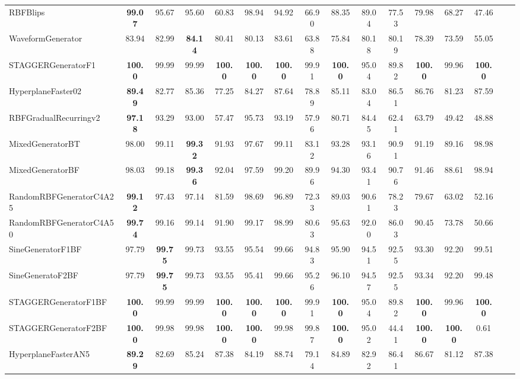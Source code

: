 \documentclass[reqno]{vcuthesis}
\numberwithin{equation}{chapter}
\begin{document}
\begin{table}[t!]
{\begin{tabularx}{1.45\textwidth}{l@{\extracolsep{\fill}}ccccccccccccccc}
RBFBlips &  \textbf{99.07} & 95.67 & 95.60 & 60.83 & 98.94 & 94.92 & 66.90 & 88.35 & 89.04 & 77.53 & 79.98 & 68.27 & 47.46 \\
WaveformGenerator & 83.94 & 82.99 &  \textbf{84.14} & 80.41 & 80.13 & 83.61 & 63.88 & 75.84 & 80.18 & 80.19 & 78.39 & 73.59 & 55.05 \\
STAGGERGeneratorF1 &  \textbf{100.0} & 99.99 & 99.99 &  \textbf{100.0} &  \textbf{100.0} &  \textbf{100.0} & 99.91 &  \textbf{100.0} & 95.04 & 89.82 &  \textbf{100.0} & 99.96 &  \textbf{100.0}  \\
HyperplaneFaster02 &  \textbf{89.49} & 82.77 & 85.36 & 77.25 & 84.27 & 87.64 & 78.89 & 85.11 & 83.04 & 86.51 & 86.76 & 81.23 & 87.59 \\
RBFGradualRecurringv2 &  \textbf{97.18} & 93.29 & 93.00 & 57.47 & 95.73 & 93.19 & 57.96 & 80.71 & 84.45 & 62.41 & 63.79 & 49.42 & 48.88 \\
MixedGeneratorBT & 98.00 & 99.11 &  \textbf{99.32} & 91.93 & 97.67 & 99.11 & 83.12 & 93.28 & 93.16 & 90.91 & 91.19 & 89.16 & 98.98 \\
MixedGeneratorBF & 98.03 & 99.18 &  \textbf{99.36} & 92.04 & 97.59 & 99.20 & 89.96 & 94.30 & 93.41 & 90.76 & 91.46 & 88.61 & 98.94 \\
RandomRBFGeneratorC4A25 &  \textbf{99.12} & 97.43 & 97.14 & 81.59 & 98.69 & 96.89 & 72.33 & 89.03 & 90.61 & 78.23 & 79.67 & 63.02 & 52.16 \\
RandomRBFGeneratorC4A50 &  \textbf{99.74} & 99.16 & 99.14 & 91.90 & 99.17 & 98.99 & 80.63 & 95.63 & 92.00 & 86.03 & 90.45 & 73.78 & 50.66 \\
SineGeneratorF1BF & 97.79 &  \textbf{99.75} & 99.73 & 93.55 & 95.54 & 99.66 & 94.83 & 95.90 & 94.51 & 92.55 & 93.30 & 92.20 & 99.51 \\
SineGeneratoF2BF & 97.79 &  \textbf{99.75} & 99.73 & 93.55 & 95.41 & 99.66 & 95.26 & 96.10 & 94.57 & 92.55 & 93.34 & 92.20 & 99.48 \\
STAGGERGeneratorF1BF &  \textbf{100.0} & 99.99 & 99.99 &  \textbf{100.0} &  \textbf{100.0} &  \textbf{100.0} & 99.91 &  \textbf{100.0} & 95.04 & 89.82 &  \textbf{100.0} & 99.96 &  \textbf{100.0}  \\
STAGGERGeneratorF2BF &  \textbf{100.0} & 99.98 & 99.98 &  \textbf{100.0} &  \textbf{100.0} & 99.98 & 99.87 &  \textbf{100.0} & 95.02 & 44.41 &  \textbf{100.0} &  \textbf{100.0} & 0.61 \\
HyperplaneFasterAN5 &  \textbf{89.29} & 82.69 & 85.24 & 87.38 & 84.19 & 88.74 & 79.14 & 84.89 & 82.92 & 86.41 & 86.67 & 81.12 & 87.38 \\

\end{tabularx}}
\end{table}
\end{document}
